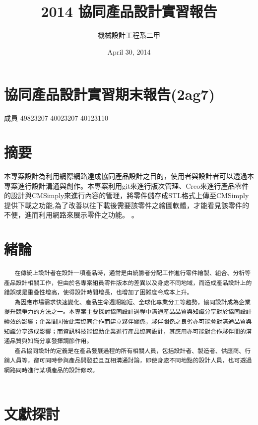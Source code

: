 \documentclass[]{article}
\title{2014 協同產品設計實習報告}
\author{機械設計工程系二甲}
\date{April 30, 2014}
\begin{document}
\maketitle

{
\hypersetup{linkcolor=black}
\setcounter{tocdepth}{3}
\tableofcontents
}
\section{協同產品設計實習期末報告(2ag7)}\label{ux5354ux540cux7522ux54c1ux8a2dux8a08ux5be6ux7fd2ux671fux672bux5831ux544a2ag7}

成員 49823207 40023207 40123110

\section{摘要}\label{ux6458ux8981}

本專案設計為利用網際網路達成協同產品設計之目的，使用者與設計者可以透過本專案進行設計溝通與創作。本專案利用git來進行版次管理、Creo來進行產品零件的設計與CMSimply來進行內容的管理，將零件儲存成STL格式上傳至CMSimply提供下載之功能,為了改善以往下載後需要該零件之繪圖軟體，才能看見該零件的不便，進而利用網路來展示零件之功能。
。

\section{緒論}\label{ux7dd2ux8ad6}

\begin{verbatim}
   在傳統上設計者在設計一項產品時，通常是由統籌者分配工作進行零件繪製、組合、分析等產品設計相關工作，但由於各專案組員零件版本的差異以及身處不同地域，而造成產品設計上的錯誤或是重疊性增高，使得設計時間增長，也增加了困難度令成本上升。
   為因應市場需求快速變化、產品生命週期縮短、全球化專業分工等趨勢，協同設計成為企業提升競爭力的方法之一。本專案主要探討協同設計過程中溝通產品品質與知識分享對於協同設計績效的影響；企業間因彼此需協同合作而建立夥伴關係，夥伴關係之良劣亦可能會對溝通品質與知識分享造成影響；而資訊科技能協助企業進行產品協同設計，其應用亦可能對合作夥伴間的溝通品質與知識分享發揮調節作用。
   產品協同設計的定義是在產品發展過程的所有相關人員，包括設計者、製造者、供應商、行銷人員等，都可同時參與產品開發並且互相溝通討論，即使身處不同地點的設計人員，也可透過網路同時進行某項產品的設計修改。   
   
\end{verbatim}

\section{文獻探討}\label{ux6587ux737bux63a2ux8a0e}
\end{document}
